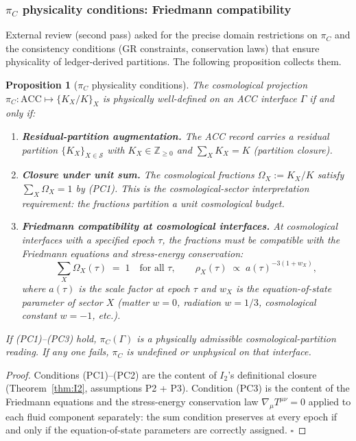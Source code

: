 \documentclass[11pt]{article}
\theoremstyle{plain}
\newtheorem{proposition}[theorem]{Proposition}
\theoremstyle{definition}
\theoremstyle{remark}
\begin{document}
\subsubsection*{$\pi_C$ physicality conditions: Friedmann compatibility}

\noindent External review (second pass) asked for the precise domain restrictions on $\pi_C$ and the consistency conditions (GR constraints, conservation laws) that ensure physicality of ledger-derived partitions.  The following proposition collects them.

\begin{proposition}[$\pi_C$ physicality conditions]\label{prop:piC_physicality}
The cosmological projection $\pi_C : \mathrm{ACC} \mapsto \{K_X/K\}_X$ is physically well-defined on an ACC interface $\Gamma$ if and only if:
\begin{enumerate}[leftmargin=2.5em,label=\textup{(PC\arabic*)},itemsep=3pt]
  \item \textbf{Residual-partition augmentation.}  The ACC record carries a residual partition $\{K_X\}_{X \in \mathcal{S}}$ with $K_X \in \mathbb{Z}_{\geq 0}$ and $\sum_X K_X = K$ (partition closure).
  \item \textbf{Closure under unit sum.}  The cosmological fractions $\Omega_X := K_X / K$ satisfy $\sum_X \Omega_X = 1$ by (PC1).  This is the cosmological-sector interpretation requirement: the fractions partition a unit cosmological budget.
  \item \textbf{Friedmann compatibility at cosmological interfaces.}  At cosmological interfaces with a specified epoch $\tau$, the fractions must be compatible with the Friedmann equations and stress-energy conservation:
  \[
    \sum_X \Omega_X(\tau) \;=\; 1 \quad \text{for all }\tau,
    \qquad
    \rho_X(\tau) \;\propto\; a(\tau)^{-3(1 + w_X)},
  \]
  where $a(\tau)$ is the scale factor at epoch $\tau$ and $w_X$ is the equation-of-state parameter of sector $X$ (matter $w = 0$, radiation $w = 1/3$, cosmological constant $w = -1$, etc.).
\end{enumerate}
If (PC1)--(PC3) hold, $\pi_C(\Gamma)$ is a physically admissible cosmological-partition reading.  If any one fails, $\pi_C$ is undefined or unphysical on that interface.
\end{proposition}

\begin{proof}
Conditions (PC1)--(PC2) are the content of $I_2$'s definitional closure (Theorem~\ref{thm:I2}, assumptions P2 + P3).  Condition (PC3) is the content of the Friedmann equations and the stress-energy conservation law $\nabla_\mu T^{\mu\nu} = 0$ applied to each fluid component separately: the sum condition preserves at every epoch if and only if the equation-of-state parameters are correctly assigned.  $\square$
\end{proof}
\end{document}

